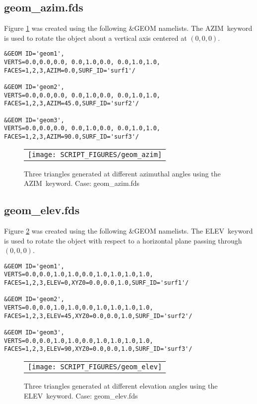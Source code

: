 \documentclass[12pt]{article}
\begin{document}
\subsection{geom\_azim.fds}
Figure \ref{fig:geom_azim} was created using the following \&GEOM namelists.
The {\ct AZIM}\ keyword is used to rotate the object about a vertical axis
centered at $(0,0,0)$.

{\small
\begin{verbatim}
&GEOM ID='geom1',
VERTS=0.0,0.0,0.0, 0.0,1.0,0.0, 0.0,1.0,1.0,
FACES=1,2,3,AZIM=0.0,SURF_ID='surf1'/

&GEOM ID='geom2',
VERTS=0.0,0.0,0.0, 0.0,1.0,0.0, 0.0,1.0,1.0,
FACES=1,2,3,AZIM=45.0,SURF_ID='surf2'/

&GEOM ID='geom3',
VERTS=0.0,0.0,0.0, 0.0,1.0,0.0, 0.0,1.0,1.0,
FACES=1,2,3,AZIM=90.0,SURF_ID='surf3'/
\end{verbatim}
}

\begin{figure}
\begin{center}
\begin{tabular}{c}
 \texttt{[image: SCRIPT\_FIGURES/geom\_azim]}
  \end{tabular}
\end{center}
 \caption{Three triangles generated at different azimuthal angles using the {\ct AZIM}\ keyword. Case: geom\_azim.fds}
\label{fig:geom_azim}
\end{figure}

\subsection{geom\_elev.fds}
Figure \ref{fig:geom_elev} was created using the following \&GEOM namelists.
The {\ct ELEV}\ keyword is used to rotate the object with respect to a horizontal plane
passing through $(0,0,0)$.

{\small
\begin{verbatim}
&GEOM ID='geom1',
VERTS=0.0,0.0,1.0,1.0,0.0,1.0,1.0,1.0,1.0,
FACES=1,2,3,ELEV=0,XYZ0=0.0,0.0,1.0,SURF_ID='surf1'/

&GEOM ID='geom2',
VERTS=0.0,0.0,1.0,1.0,0.0,1.0,1.0,1.0,1.0,
FACES=1,2,3,ELEV=45,XYZ0=0.0,0.0,1.0,SURF_ID='surf2'/

&GEOM ID='geom3',
VERTS=0.0,0.0,1.0,1.0,0.0,1.0,1.0,1.0,1.0,
FACES=1,2,3,ELEV=90,XYZ0=0.0,0.0,1.0,SURF_ID='surf3'/
\end{verbatim}
}

\begin{figure}
\begin{center}
\begin{tabular}{c}
 \texttt{[image: SCRIPT\_FIGURES/geom\_elev]}
  \end{tabular}
\end{center}
 \caption{Three triangles generated at different elevation angles using the {\ct ELEV}\ keyword. Case: geom\_elev.fds}
\label{fig:geom_elev}
\end{figure}
\end{document}
